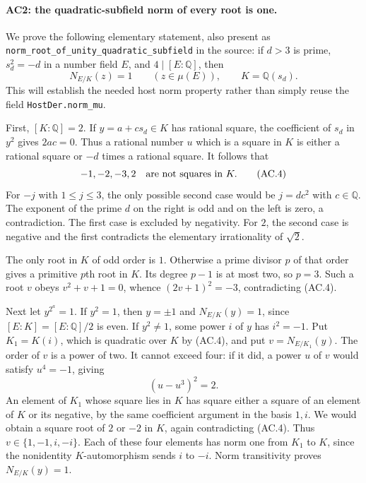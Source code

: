 \documentclass[11pt,a4paper]{article}
\numberwithin{equation}{section}
\theoremstyle{remark}\newtheorem{remark}[theorem]{Remark}
\begin{document}
\paragraph{AC2: the quadratic-subfield norm of every root is one.}
We prove the following elementary statement, also present as
\texttt{norm\_\allowbreak root\_\allowbreak of\_\allowbreak unity\_\allowbreak quadratic\_\allowbreak subfield} in the source:
if $d>3$ is prime, $s_d^2=-d$ in a number field $E$, and
$4\mid[E:\mathbb Q]$, then
\[
                  N_{E/K}(z)=1\qquad(z\in\mu(E)),
            \qquad K=\mathbb Q(s_d).                         \tag{AC.3}
\]
This will establish the needed host norm property rather than simply
reuse the field \texttt{HostDer.norm\_\allowbreak mu}.

First, $[K:\mathbb Q]=2$. If $y=a+c s_d\in K$ has rational square,
the coefficient of $s_d$ in $y^2$ gives $2ac=0$. Thus a rational number
$u$ which is a square in $K$ is either a rational square or $-d$ times
a rational square. It follows that
\[
             -1,-2,-3,2\quad\hbox{are not squares in }K.
                                                               \tag{AC.4}
\]
For $-j$ with $1\leq j\leq3$, the only possible second case would be
$j=d c^2$ with $c\in\mathbb Q$. The exponent of the prime $d$ on the
right is odd and on the left is zero, a contradiction. The first
case is excluded by negativity. For $2$, the second case is negative
and the first contradicts the elementary irrationality of $\sqrt2$.

The only root in $K$ of odd order is $1$. Otherwise a prime divisor
$p$ of that order gives a primitive $p$th root in $K$. Its degree
$p-1$ is at most two, so $p=3$. Such a root $v$ obeys
$v^2+v+1=0$, whence $(2v+1)^2=-3$, contradicting (AC.4).

Next let $y^{2^a}=1$. If $y^2=1$, then $y=\pm1$ and
$N_{E/K}(y)=1$, since $[E:K]=[E:\mathbb Q]/2$ is even.
If $y^2\ne1$, some power $i$ of $y$ has $i^2=-1$.
Put $K_1=K(i)$, which is quadratic over $K$ by (AC.4), and put
$v=N_{E/K_1}(y)$. The order of $v$ is a power of two.
It cannot exceed four: if it did, a power $u$ of $v$ would satisfy
$u^4=-1$, giving
\[
                         (u-u^3)^2=2.
\]
An element of $K_1$ whose square lies in $K$ has square either a
square of an element of $K$ or its negative, by the same coefficient
argument in the basis $1,i$. We would obtain a square root of $2$
or $-2$ in $K$, again contradicting (AC.4).
Thus $v\in\{1,-1,i,-i\}$. Each of these four elements has norm one
from $K_1$ to $K$, since the nonidentity $K$-automorphism sends
$i$ to $-i$. Norm transitivity proves $N_{E/K}(y)=1$.
\end{document}
